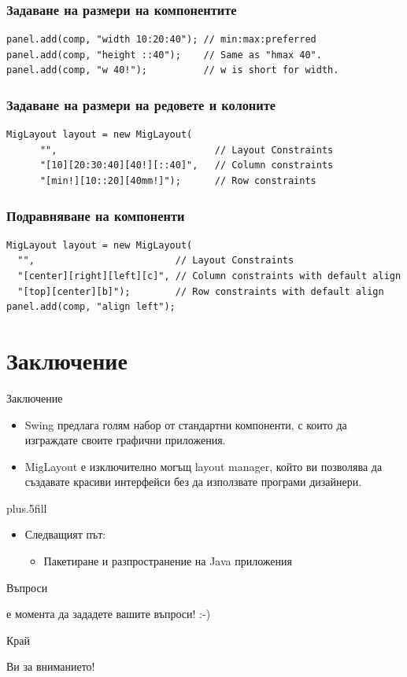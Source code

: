 \documentclass{beamer}
\begin{document}
\begin{frame}[fragile]
  \frametitle{Задаване на размери на компонентите}
  \transdissolve
\begin{lstlisting}
panel.add(comp, "width 10:20:40"); // min:max:preferred 
panel.add(comp, "height ::40");    // Same as "hmax 40".
panel.add(comp, "w 40!");          // w is short for width.
\end{lstlisting}
\end{frame}

\begin{frame}[fragile]
  \frametitle{Задаване на размери на редовете и колоните}
  \transdissolve
\begin{lstlisting}
MigLayout layout = new MigLayout(
      "",                            // Layout Constraints
      "[10][20:30:40][40!][::40]",   // Column constraints
      "[min!][10::20][40mm!]");      // Row constraints  
\end{lstlisting}
\end{frame}

\begin{frame}[fragile]
  \frametitle{Подравняване на компоненти}
  \transdissolve
\begin{lstlisting}
MigLayout layout = new MigLayout(
  "",                         // Layout Constraints
  "[center][right][left][c]", // Column constraints with default align
  "[top][center][b]");        // Row constraints with default align
panel.add(comp, "align left");
\end{lstlisting}
\end{frame}


\section*{Заключение}

\begin{frame}{Заключение}
  \transdissolve
  \begin{itemize}
  \item
    Swing предлага голям набор от стандартни компоненти, с които да
    изграждате своите графични приложения.
  \item
    MigLayout е изключително могъщ layout manager, който ви позволява
    да създавате красиви интерфейси без да използвате програми дизайнери.
  \end{itemize}
  
  \vskip0pt plus.5fill
  \begin{itemize}
  \item
    Следващият път:
    \begin{itemize}
    \item
      Пакетиране и разпространение на Java приложения
    \end{itemize}
  \end{itemize}
\end{frame}

\begin{frame}{Въпроси}
  \transdissolve
  \begin{center}
     е момента да зададете вашите въпроси! :-)
  \end{center}
\end{frame}

\begin{frame}{Край}
  \transdissolve
  \begin{center}
     Ви за вниманието!
  \end{center}
\end{frame}
\end{document}
